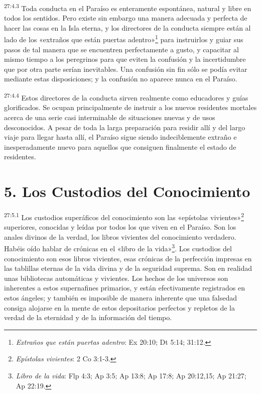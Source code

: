 \par
\textsuperscript{27:4.3} Toda conducta en el Paraíso es enteramente espontánea, natural y libre en todos los sentidos. Pero existe sin embargo una manera adecuada y perfecta de hacer las cosas en la Isla eterna, y los directores de la conducta siempre están al lado de los «extraños que están puertas adentro»\footnote{\textit{Extraños que están puertas adentro}: Ex 20:10; Dt 5:14; 31:12.} para instruirlos y guiar sus pasos de tal manera que se encuentren perfectamente a gusto, y capacitar al mismo tiempo a los peregrinos para que eviten la confusión y la incertidumbre que por otra parte serían inevitables. Una confusión sin fin sólo se podía evitar mediante estas disposiciones; y la confusión no aparece nunca en el Paraíso.

\par
\textsuperscript{27:4.4} Estos directores de la conducta sirven realmente como educadores y guías glorificados. Se ocupan principalmente de instruir a los nuevos residentes mortales acerca de una serie casi interminable de situaciones nuevas y de usos desconocidos. A pesar de toda la larga preparación para residir allí y del largo viaje para llegar hasta allí, el Paraíso sigue siendo indeciblemente extraño e inesperadamente nuevo para aquellos que consiguen finalmente el estado de residentes.

\section*{5. Los Custodios del Conocimiento}
\par
\textsuperscript{27:5.1} Los custodios superáficos del conocimiento son las «epístolas vivientes»\footnote{\textit{Epístolas vivientes}: 2 Co 3:1-3.} superiores, conocidas y leídas por todos los que viven en el Paraíso. Son los anales divinos de la verdad, los libros vivientes del conocimiento verdadero. Habéis oído hablar de crónicas en el «libro de la vida»\footnote{\textit{Libro de la vida}: Flp 4:3; Ap 3:5; Ap 13:8; Ap 17:8; Ap 20:12,15; Ap 21:27; Ap 22:19.}. Los custodios del conocimiento son esos libros vivientes, esas crónicas de la perfección impresas en las tablillas eternas de la vida divina y de la seguridad suprema. Son en realidad unas bibliotecas automáticas y vivientes. Los hechos de los universos son inherentes a estos supernafines primarios, y están efectivamente registrados en estos ángeles; y también es imposible de manera inherente que una falsedad consiga alojarse en la mente de estos depositarios perfectos y repletos de la verdad de la eternidad y de la información del tiempo.

